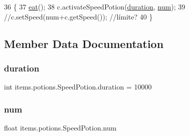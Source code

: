 \begin{DoxyCode}
36                                \{
37         \mbox{\hyperlink{classitems_1_1_potion_a33ab3390826ef43ddfa94fc812e53afe}{eat}}();
38         c.activateSpeedPotion(\mbox{\hyperlink{classitems_1_1potions_1_1_speed_potion_a4b068bd8e0be9c84fe4711fc486eeacc}{duration}}, \mbox{\hyperlink{classitems_1_1potions_1_1_speed_potion_aea1ee6c20166ae724fc8218fc990d4f2}{num}});
39         \textcolor{comment}{//c.setSpeed(num+c.getSpeed());       //límite?  }
40     \}
\end{DoxyCode}


\subsection{Member Data Documentation}
\mbox{\label{classitems_1_1potions_1_1_speed_potion_a4b068bd8e0be9c84fe4711fc486eeacc}} 
\subsubsection{\texorpdfstring{duration}{duration}}
{\footnotesize\ttfamily int items.\+potions.\+Speed\+Potion.\+duration = 10000\hspace{0.3cm}{\ttfamily [package]}}

\mbox{\label{classitems_1_1potions_1_1_speed_potion_aea1ee6c20166ae724fc8218fc990d4f2}} 
\subsubsection{\texorpdfstring{num}{num}}
{\footnotesize\ttfamily float items.\+potions.\+Speed\+Potion.\+num\hspace{0.3cm}{\ttfamily [private]}}

